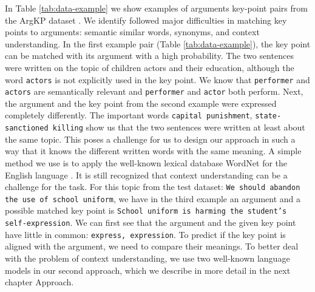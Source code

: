 In Table \ref{tab:data-example} we show examples of arguments key-point pairs from the ArgKP dataset \cite{Bar-HaimEFKLS2020}. 
We identify followed major difficulties in matching key points to arguments: semantic similar words, synonyms, and context understanding.
In the first example pair (Table \ref{tab:data-example}), the key point can be matched with its argument with a high probability. 
The two sentences were written on the topic of children actors and their education, although the word \texttt{actors} is not explicitly used in the key point. 
We know that \texttt{performer} and \texttt{actors} are semantically relevant and \texttt{performer} and \texttt{actor} both perform. Next, the argument and the key point from the second example were expressed completely differently. 
The important words \texttt{capital punishment}, \texttt{state-sanctioned killing} show us that the two sentences were written at least about the same topic. 
This poses a challenge for us to design our approach in such a way that it knows the different written words with the same meaning. 
A simple method we use is to apply the well-known lexical database WordNet for the English language \cite{Miller1995}.
It is still recognized that context understanding can be a challenge for the task. For this topic from the test dataset:
\texttt{We should abandon the use of school uniform}, we have in the third example an argument and a possible matched key point is \texttt{School uniform is harming the student's self-expression}. 
We can first see that the argument and the given key point have little in common: \texttt{express, expression}. 
To predict if the key point is aligned with the argument, we need to compare their meanings. 
To better deal with the problem of context understanding, we use two well-known language models in our second approach, which we describe in more detail in the next chapter Approach.
